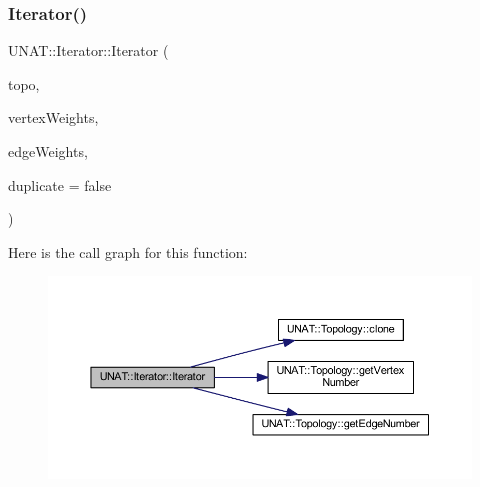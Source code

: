 \mbox{\label{classUNAT_1_1Iterator_acc1365ff1a2078c14424624b75fe2c7e}} 
\subsubsection{\texorpdfstring{Iterator()}{Iterator()}\hspace{0.1cm}{\footnotesize\ttfamily [4/4]}}
{\footnotesize\ttfamily U\+N\+A\+T\+::\+Iterator\+::\+Iterator (\begin{DoxyParamCaption}\item[{\mbox{\hyperlink{classUNAT_1_1Topology}{Topology}} \&}]{topo,  }\item[{\mbox{\hyperlink{include_2swMacro_8h_a113cf5f6b5377cdf3fac6aa4e443e9aa}{sw\+Int}} $\ast$}]{vertex\+Weights,  }\item[{\mbox{\hyperlink{include_2swMacro_8h_a113cf5f6b5377cdf3fac6aa4e443e9aa}{sw\+Int}} $\ast$}]{edge\+Weights,  }\item[{bool}]{duplicate = {\ttfamily false} }\end{DoxyParamCaption})\hspace{0.3cm}{\ttfamily [inline]}}

Here is the call graph for this function\+:
\nopagebreak
\begin{figure}[H]
\begin{center}
\leavevmode
\includegraphics[width=350pt]{classUNAT_1_1Iterator_acc1365ff1a2078c14424624b75fe2c7e_cgraph}
\end{center}
\end{figure}
\mbox{\label{classUNAT_1_1Iterator_a5fe65bc2a92032f20c20adf525e0aa26}} 
